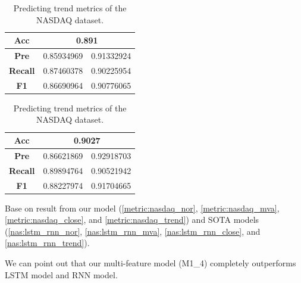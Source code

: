 \begin{table}[H]
	\centering
	\begin{minipage}{0.45\textwidth}
		\centering
		\begin{tabular}{|c|c|c|}
			\hline
			\textbf{Acc}    & \multicolumn{2}{c|}{0.891} \\
			\hline
			\textbf{Pre}    & 0.85934969                & 0.91332924 \\
			\hline
			\textbf{Recall} & 0.87460378                & 0.90225954 \\
			\hline
			\textbf{F1}     & 0.86690964                & 0.90776065 \\
			\hline
		\end{tabular}
	\end{minipage}
	\begin{minipage}{0.45\textwidth}
		\centering
		\begin{tabular}{|c|c|c|}
			\hline
			\textbf{Acc}    & \multicolumn{2}{c|}{0.9027
			} \\
			\hline
			\textbf{Pre}    & 0.86621869                & 0.92918703 \\
			\hline
			\textbf{Recall} & 0.89894764                & 0.90521942 \\
			\hline
			\textbf{F1}     & 0.88227974                & 0.91704665 \\
			\hline
		\end{tabular}
	\end{minipage}
	\caption{Predicting trend metrics of the NASDAQ dataset.}
	\label{nas:lstm_rnn_trend}
\end{table}

Base on result from our model (\autoref{metric:nasdaq_nor},
\autoref{metric:nasdaq_mva}, \autoref{metric:nasdaq_close}, and
\autoref{metric:nasdaq_trend}) and SOTA models (\autoref{nas:lstm_rnn_nor}, \autoref{nas:lstm_rnn_mva},
\autoref{nas:lstm_rnn_close}, and \autoref{nas:lstm_rnn_trend}).

We can point out that our multi-feature model (M1\_4) completely outperforms LSTM model
and RNN model.

